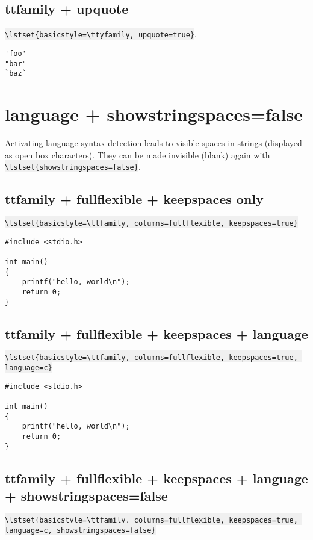 \documentclass{article}
\newcommand{\bs}{\textbackslash}
\newcommand{\ttt}[1]{\colorbox[HTML]{f0f0f0}{\texttt{#1}}}
\begin{document}
\subsection{ttfamily + upquote}
\ttt{\bs{}lstset\{basicstyle=\bs{}ttyfamily, upquote=true\}}.

{
\lstset{basicstyle=\ttfamily, upquote=true}
\begin{lstlisting}
'foo'
"bar"
`baz`
\end{lstlisting}
}

\pagebreak


\section{language + showstringspaces=false}
Activating language syntax detection leads to visible spaces in strings
(displayed as open box characters). They can be made invisible (blank)
again with \ttt{\bs{}lstset\{showstringspaces=false\}}.

\subsection{ttfamily + fullflexible + keepspaces only}
{
\small
\ttt{\bs{}lstset\{basicstyle=\bs{}ttfamily, columns=fullflexible,
                     keepspaces=true\}}
}

{
\lstset{
    basicstyle=\ttfamily,
    columns=fullflexible,
    keepspaces=true,
}
\begin{lstlisting}
#include <stdio.h>

int main()
{
    printf("hello, world\n");
    return 0;
}
\end{lstlisting}
}

\subsection{ttfamily + fullflexible + keepspaces + language}
{
\small
\ttt{\bs{}lstset\{basicstyle=\bs{}ttfamily, columns=fullflexible,
                     keepspaces=true, language=c\}}
}

{
\lstset{
    basicstyle=\ttfamily,
    columns=fullflexible,
    keepspaces=true,
    language=c,
}
\begin{lstlisting}
#include <stdio.h>

int main()
{
    printf("hello, world\n");
    return 0;
}
\end{lstlisting}
}

\subsection{ttfamily + fullflexible + keepspaces + language +
            showstringspaces=false}
{
\small
\ttt{\bs{}lstset\{basicstyle=\bs{}ttfamily, columns=fullflexible,
                     keepspaces=true, language=c, showstringspaces=false\}}
}
\end{document}
